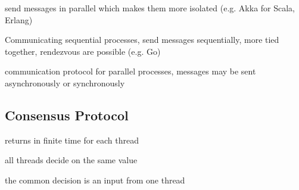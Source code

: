 \documentclass[11pt]{article}
\begin{document}
\begin{description}[noitemsep]
	\item[Actors] send messages in parallel which makes them more isolated (e.g. Akka for Scala, Erlang)
	\item[CSP] Communicating sequential processes, send messages sequentially, more tied together, rendezvous are possible (e.g. Go)
	\item[MPI] communication protocol for parallel processes, messages may be sent asynchronously or synchronously
\end{description}

\subsection{Consensus Protocol}

\begin{description}[noitemsep]
	\item[wait-free] returns in finite time for each thread
	\item[consistent] all threads decide on the same value
	\item[valid] the common decision is an input from one thread
\end{description}
	
\end{document}
